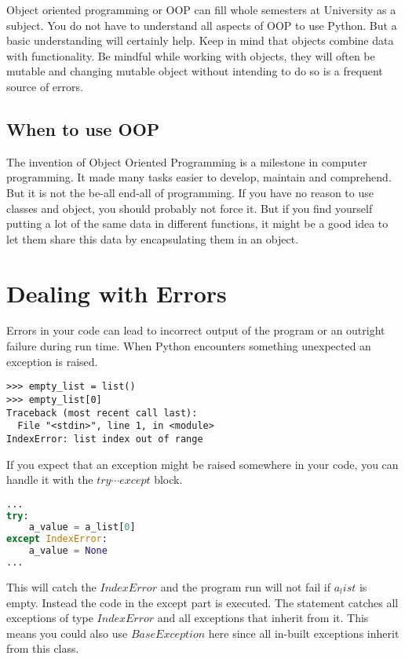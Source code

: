 \documentclass{article}
\begin{document}
Object oriented programming or OOP can fill whole semesters at University as a subject.
You do not have to understand all aspects of OOP to use Python.
But a basic understanding will certainly help.
Keep in mind that objects combine data with functionality.
Be mindful while working with objects, they will often be mutable and
changing mutable object without intending to do so is a frequent source of errors.

\subsection{When to use OOP}

The invention of Object Oriented Programming is a milestone in computer programming.
It made many tasks easier to develop, maintain and comprehend.
But it is not the be-all end-all of programming.
If you have no reason to use classes and object, you should probably not force it.
But if you find yourself putting a lot of the same data in different functions,
it might be a good idea to let them share this data by encapsulating them
in an object.


\section{Dealing with Errors}

Errors in your code can lead to incorrect output of the program or an outright failure during run time.
When Python encounters something unexpected an exception is raised.

\begin{lstlisting}
>>> empty_list = list()
>>> empty_list[0]
Traceback (most recent call last):
  File "<stdin>", line 1, in <module>
IndexError: list index out of range
\end{lstlisting}

If you expect that an exception might be raised somewhere in your code, you can handle it with the $try \cdots except$ block.


\begin{lstlisting}[language=Python]
...
try:
    a_value = a_list[0]
except IndexError:
    a_value = None
...
\end{lstlisting}

This will catch the $IndexError$ and the program run will not fail if $a_list$ is empty.
Instead the code in the except part is executed.
The statement catches all exceptions of type $IndexError$ and all exceptions that inherit from it.
This means you could also use $BaseException$ here since all in-built exceptions inherit from this class.
\end{document}
